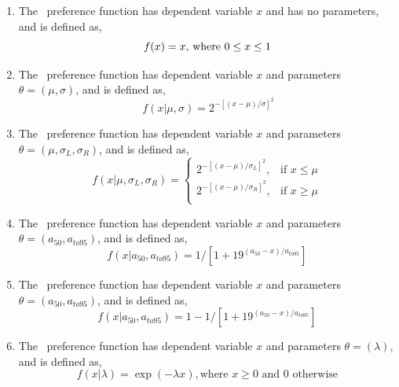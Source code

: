 \begin{enumerate}
\item The \ preference function has dependent variable $x$ and has no parameters, and is defined as,
\begin{equation}
f(x)=x$, where $0 \leq x \leq 1
\end{equation}

\item The \ preference function has dependent variable $x$ and parameters $\theta = (\mu,\sigma)$, and is defined as, 
\begin{equation}\
f(x | \mu, \sigma) = 2^{-[(x- \mu)/\sigma ]^2} 
\end{equation}
 
\item The \ preference function has dependent variable $x$ and parameters $\theta=(\mu,\sigma_L,\sigma_R)$, and is defined as,
\begin{equation}
  f(x | \mu, \sigma_L, \sigma_R) = \begin{cases}
    2^{-[(x- \mu)/\sigma_L ]^2}, & \text{if $x \leq \mu$} \\
    2^{-[(x- \mu)/\sigma_R ]^2}, & \text{if $x \ge \mu$}\\
  \end{cases}
\end{equation} 

\item The \ preference function has dependent variable $x$ and parameters $\theta = (a_{50},a_{to95})$, and is defined as,
\begin{equation}
  f(x | a_{50}, a_{to95}) = 1 / [1+19^{(a_{50}-x)/a_{to95}}]
\end{equation}

\item The \ preference function has dependent variable $x$ and parameters $\theta = (a_{50},a_{to95})$, and is defined as,
\begin{equation}
  f(x | a_{50}, a_{to95}) =1- 1 / [1+19^{(a_{50}-x)/a_{to95}}]
\end{equation}

\item The \ preference function has dependent variable $x$ and parameters $\theta = (\lambda)$, and is defined as,
\begin{equation}
  f(x | \lambda) =\exp(-\lambda x), \text{where $x \geq 0$ and $0$ otherwise}
\end{equation}


\end{enumerate}
